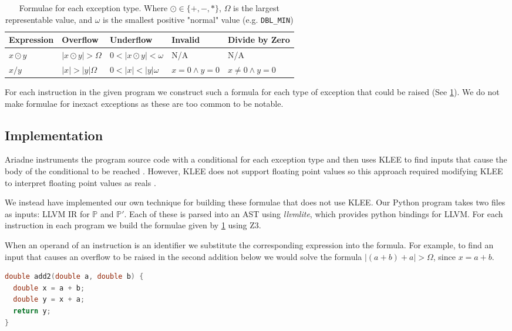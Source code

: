 \documentclass{article}
\begin{document}
\begin{table}[h]
\begin{tabular}{lllll}
Expression  & Overflow             & Underflow & Invalid & Divide by Zero \\ \hline
$x \odot y$ & $|x \odot y| > \Omega$ & $0 < |x \odot y| < \omega$ & N/A & N/A \\
$x / y$     & $|x| > |y| \Omega$     & $0 < |x| < |y| \omega $ &
  $x = 0 \land y = 0$ & $x \neq 0 \land y = 0$ \\
\end{tabular}
\caption{Formulae for each exception type. Where $\odot \in \{+, -, *\}$,
  $\Omega$ is the largest representable value, and $\omega$ is the smallest
  positive "normal" value (e.g. \texttt{DBL\_MIN})}
\label{table:formulae}
\end{table}

For each instruction in the given program we construct such a formula for each
type of exception that could be raised (See \ref{table:formulae}). We do not
make formulae for inexact exceptions as these are too common to be notable.

\subsection{Implementation}

Ariadne instruments the program source code with a conditional for each
exception type and then uses KLEE to find inputs that cause the body of the
conditional to be reached \cite[3-4]{barr_automatic_2013}. However, KLEE does
not support floating point values so this approach required modifying KLEE to
interpret floating point values as reals \cite[2]{barr_automatic_2013}.

We instead have implemented our own technique for building these formulae that
does not use KLEE. Our Python program takes two files as inputs: LLVM IR for
$\mathbb{P}$ and $\mathbb{P'}$. Each of these is parsed into an AST using
\textit{llvmlite}, which provides python bindings for LLVM. For each instruction
in each program we build the formulae given by \ref{table:formulae} using Z3.

When an operand of an instruction is an identifier we substitute the
corresponding expression into the formula. For example, to find an input that
causes an overflow to be raised in the second addition below we would solve the
formula $|(a + b) + a| > \Omega$, since $x = a + b$.

\begin{lstlisting}[language=C]
double add2(double a, double b) {
  double x = a + b;
  double y = x + a;
  return y;
}
\end{lstlisting}
\end{document}
